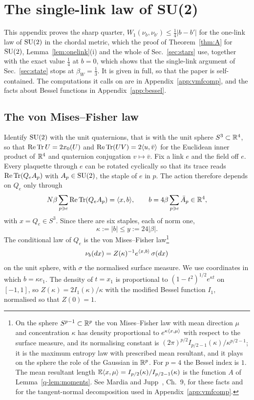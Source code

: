 \section{The single-link law of SU(2)}\label{app:sharp}

This appendix proves the sharp quarter, $W_1(\nu_b,\nu_{b'})\le\frac14|b-b'|$
for the one-link law of $\mathrm{SU}(2)$ in the chordal metric, which
the proof of Theorem~\ref{thm:A} for $\mathrm{SU}(2)$, Lemma~\ref{lem:onelink}(i) and the whole of
Sec.~\ref{sec:stars} use, together with the exact value $\frac14$ at $b=0$,
which shows that the single-link argument of Sec.~\ref{sec:state} stops at
$\beta_W=\frac13$. It is given in full, so that the paper is self-contained. The computations it calls on are in
Appendix~\ref{app:vmfcomp}, and the facts about Bessel functions in
Appendix~\ref{app:bessel}.

\subsection{The von Mises--Fisher law}

Identify $\mathrm{SU}(2)$ with the unit quaternions, that is with the unit sphere
$S^3\subset\mathbb{R}^4$, so that $\operatorname{Re}\operatorname{Tr} U=2x_0(U)$ and $\operatorname{Re}\operatorname{Tr}(UV)=2\langle u,\bar v\rangle$
for the Euclidean inner product of $\mathbb{R}^4$ and quaternion conjugation
$v\mapsto\bar v$. Fix a link $e$ and the field off $e$. Every plaquette
through $e$ can be rotated cyclically so that its trace reads $\operatorname{Re}\operatorname{Tr}(Q_eA_p)$
with $A_p\in\mathrm{SU}(2)$, the staple of $e$ in $p$. The action therefore depends on
$Q_e$ only through
\[
N\beta\sum_{p\ni e}\operatorname{Re}\operatorname{Tr}(Q_eA_p)=\langle x,b\rangle,\qquad
b=4\beta\sum_{p\ni e}\bar A_p\in\mathbb{R}^4,
\]
with $x=Q_e\in S^3$. Since there are six staples, each of norm one,
\begin{equation}\label{q-eq:kappamax}
\kappa:=|b|\le y:=24|\beta| .
\end{equation}
The conditional law of $Q_e$ is the von Mises--Fisher law\footnote{On the
sphere $S^{p-1}\subset\mathbb{R}^p$ the von Mises--Fisher law with mean direction
$\mu$ and concentration $\kappa$ has density proportional to
$e^{\kappa\langle x,\mu\rangle}$ with respect to the surface measure, and its normalising
constant is $(2\pi)^{p/2}I_{p/2-1}(\kappa)/\kappa^{p/2-1}$; it is the maximum
entropy law with prescribed mean resultant, and it plays on the sphere the
role of the Gaussian in $\mathbb{R}^p$. For $p=4$ the Bessel index is $1$. The mean
resultant length $\mathbb{E}\langle x,\mu\rangle=I_{p/2}(\kappa)/I_{p/2-1}(\kappa)$ is the
function $A$ of Lemma~\ref{q-lem:moments}. See Mardia and Jupp~\cite{MJ00},
Ch.~9, for these facts and for the tangent-normal decomposition used in
Appendix~\ref{app:vmfcomp}.}
\begin{equation}\label{q-eq:vmf}
\nu_b(dx)=Z(\kappa)^{-1}e^{\langle x,b\rangle}\,\sigma(dx)
\end{equation}
on the unit sphere, with $\sigma$ the normalised surface measure. We use
coordinates in which $b=\kappa e_1$. The density of $t=x_1$ is proportional
to $(1-t^2)^{1/2}e^{\kappa t}$ on $[-1,1]$, so $Z(\kappa)=2I_1(\kappa)/\kappa$
with the modified Bessel function $I_1$, normalised so that $Z(0)=1$.

